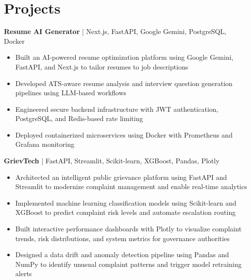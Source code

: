 \section*{Projects}
\textbf{Resume AI Generator} | Next.js, FastAPI, Google Gemini, PostgreSQL, Docker \\ %
\vspace{-9pt}
\begin{itemize}
 \item Built an AI-powered resume optimization platform using Google Gemini, FastAPI, and Next.js to tailor resumes to job descriptions
 \item Developed ATS-aware resume analysis and interview question generation pipelines using LLM-based workflows
 \item Engineered secure backend infrastructure with JWT authentication, PostgreSQL, and Redis-based rate limiting
 \item Deployed containerized microservices using Docker with Prometheus and Grafana monitoring
\end{itemize}


\textbf{GrievTech} | FastAPI, Streamlit, Scikit-learn, XGBoost, Pandas, Plotly \\ %
\vspace{-9pt}
\begin{itemize}
  \item Architected an intelligent public grievance platform using FastAPI and Streamlit to modernize complaint management and enable real-time analytics
  \item Implemented machine learning classification models using Scikit-learn and XGBoost to predict complaint risk levels and automate escalation routing
  \item Built interactive performance dashboards with Plotly to visualize complaint trends, risk distributions, and system metrics for governance authorities
  \item Designed a data drift and anomaly detection pipeline using Pandas and NumPy to identify unusual complaint patterns and trigger model retraining alerts
\end{itemize}



